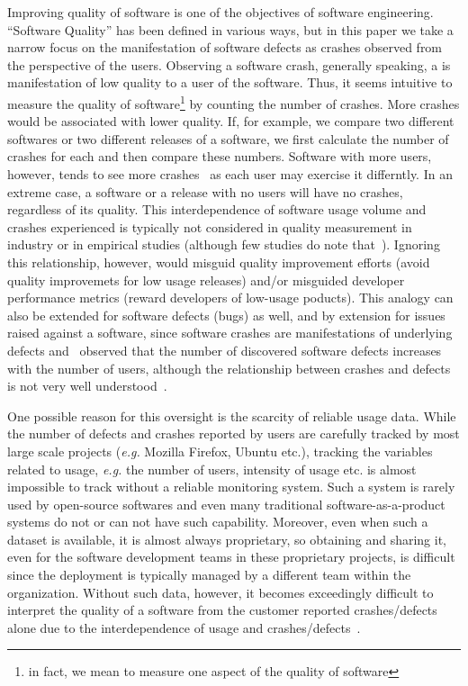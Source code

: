 \documentclass[smallextended]{svjour3}       %
\begin{document}
Improving quality of software is one of the objectives of software
engineering.  ``Software Quality'' has been defined in various ways,
but in this paper we take a narrow focus on the manifestation of software
defects as crashes observed from the perspective of the
users. Observing a software crash, generally speaking, a is
manifestation of low quality to a user of the software. 
Thus, it seems intuitive to measure the quality of software\footnote{in fact, we
  mean to measure one aspect of the quality of software}
by counting the number of crashes. More crashes would be associated
with lower quality. If, for example, we compare 
two different softwares or two different releases of a software,
we first calculate the number of crashes for each and then compare
these numbers. Software with more users, however, tends
to see more crashes~\cite{dey2018modeling,hmps15,IQ08} as each user
may exercise it differntly. In
an extreme case, a software or a release with no users will have
no crashes, regardless of its quality. This interdependence of
software usage volume and crashes experienced is typically not
considered in quality measurement in industry or in empirical studies (although few studies
do note that~\cite{fenton2008using,fenton1999critique}).
Ignoring this relationship, however, would misguid quality
improvement efforts (avoid quality improvemets for low usage
releases) and/or misguided developer
performance metrics (reward developers of low-usage poducts). This analogy can also be extended for software
defects (bugs) as well, and by extension for issues raised against a
software, since software crashes are manifestations of underlying
defects and~\cite{caper,hmps15} observed that the number of
discovered software defects increases with the number of users,
although the relationship between crashes and defects is not very
well understood~\cite{fenton1999critique}.  

One possible reason for this oversight is the scarcity of reliable usage data. While the number of defects and crashes reported by users are carefully tracked by most large scale projects (\textit{e.g.} Mozilla Firefox, Ubuntu etc.), tracking the variables related to usage, \textit{e.g.} the number of users, intensity of usage etc. is almost impossible to track without a reliable monitoring system. Such a system is rarely used by open-source softwares and even many traditional software-as-a-product systems do not or can not have such capability. Moreover, even when such a dataset is available, it is almost always proprietary, so obtaining and sharing it, even for the software development teams in these proprietary projects, is difficult since the deployment is typically managed by a different team within the organization. Without such data, however, it becomes exceedingly difficult to interpret the quality of a software from the customer reported crashes/defects alone due to the interdependence of usage and crashes/defects~\cite{dey2018modeling,hmps15,IQ08}.
\end{document}
